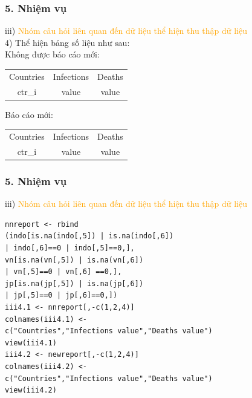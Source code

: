 \documentclass[english,10pt,table]{beamer}
\begin{document}
\begin{frame}[fragile]
\frametitle{5.  Nhiệm vụ}
	iii) \textcolor{orange}{Nhóm câu hỏi liên quan đến dữ liệu thể hiện thu thập dữ liệu}\\%
    4) Thể hiện bảng số liệu như sau:\\
    Không được báo cáo mới:
    \begin{center}
      \begin{tabular}{ c c c }
        Countries & Infections & Deaths \\ 
        ctr\_i & value  & value\\ 
      \end{tabular}
    \end{center}
    Báo cáo mới:
    \begin{center}
      \begin{tabular}{ c c c }
        Countries & Infections & Deaths \\ 
        ctr\_i & value  & value\\ 
      \end{tabular}
    \end{center}
\end{frame}

\begin{frame}[fragile]
\frametitle{5.  Nhiệm vụ}
	iii) \textcolor{orange}{Nhóm câu hỏi liên quan đến dữ liệu thể hiện thu thập dữ liệu}\\%
     \begin{lstlisting}[frame=single]  
nnreport <- rbind
(indo[is.na(indo[,5]) | is.na(indo[,6]) 
| indo[,6]==0 | indo[,5]==0,],
vn[is.na(vn[,5]) | is.na(vn[,6]) 
| vn[,5]==0 | vn[,6] ==0,],
jp[is.na(jp[,5]) | is.na(jp[,6]) 
| jp[,5]==0 | jp[,6]==0,]) 
iii4.1 <- nnreport[,-c(1,2,4)]
colnames(iii4.1) <- 
c("Countries","Infections value","Deaths value")
view(iii4.1)
iii4.2 <- newreport[,-c(1,2,4)]
colnames(iii4.2) <- 
c("Countries","Infections value","Deaths value")
view(iii4.2)
	\end{lstlisting}
\end{frame}
\end{document}
